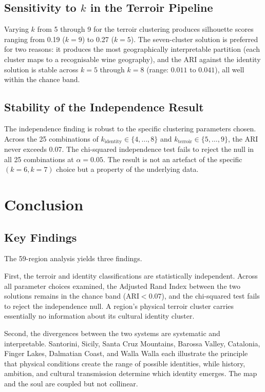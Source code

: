 \documentclass[11pt]{article}
\begin{document}
\subsection{Sensitivity to $k$ in the Terroir Pipeline}
Varying $k$ from 5 through 9 for the terroir clustering produces silhouette scores ranging from 0.19 ($k = 9$) to 0.27 ($k = 5$). The seven-cluster solution is preferred for two reasons: it produces the most geographically interpretable partition (each cluster maps to a recognisable wine geography), and the ARI against the identity solution is stable across $k = 5$ through $k = 8$ (range: $0.011$ to $0.041$), all well within the chance band.

\subsection{Stability of the Independence Result}
The independence finding is robust to the specific clustering parameters chosen. Across the 25 combinations of $k_{\text{identity}} \in \{4, \ldots, 8\}$ and $k_{\text{terroir}} \in \{5, \ldots, 9\}$, the ARI never exceeds 0.07. The chi-squared independence test fails to reject the null in all 25 combinations at $\alpha = 0.05$. The result is not an artefact of the specific $(k = 6, k = 7)$ choice but a property of the underlying data.

\section{Conclusion}

\subsection{Key Findings}
The 59-region analysis yields three findings.

First, the terroir and identity classifications are statistically independent. Across all parameter choices examined, the Adjusted Rand Index between the two solutions remains in the chance band ($\mathrm{ARI} < 0.07$), and the chi-squared test fails to reject the independence null. A region's physical terroir cluster carries essentially no information about its cultural identity cluster.

Second, the divergences between the two systems are systematic and interpretable. Santorini, Sicily, Santa Cruz Mountains, Barossa Valley, Catalonia, Finger Lakes, Dalmatian Coast, and Walla Walla each illustrate the principle that physical conditions create the range of possible identities, while history, ambition, and cultural transmission determine which identity emerges. The map and the soul are coupled but not collinear.
\end{document}
